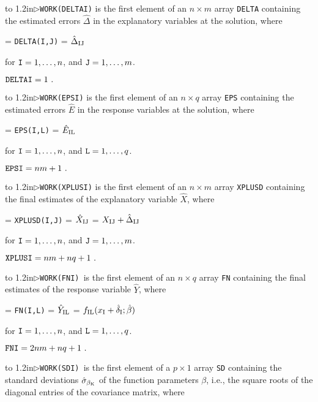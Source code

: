 \hangindent\wd\mybox{}\noindent\hbox to 1.2in{$\triangleright$\hfil{\tt WORK(DELTAI)} }is the first element of an $n\times m$ array {\tt DELTA} containing the estimated errors $\hat{\Delta}$ in the explanatory variables at the solution, where

 = {\tt DELTA(I,J)} = $\hat{\Delta}_{\rm IJ}$

\aligntobox for ${\tt I} = 1,\ldots,n$, and ${\tt J} = 1,\ldots,m$.

\aligntobox ${\tt DELTAI} = 1\ .$
\bigskip

\hangindent\wd\mybox{}\noindent\hbox to 1.2in{$\triangleright$\hfill{\tt WORK(EPSI)} }is the first element of an $n \times q$ array {\tt EPS} containing the estimated errors $\hat E$ in the response variables at the solution, where

 = {\tt EPS(I,L)} = $\hat{E}_{\rm
IL}$

\aligntobox for ${\tt I} = 1,\ldots,n$, and ${\tt L} = 1,\ldots,q$.

\aligntobox ${\tt EPSI} = nm + 1\ .$
\bigskip

\hangindent\wd\mybox{}\noindent\hbox to 1.2in{$\triangleright$\hfill{\tt WORK(XPLUSI)} }is the first element of an $n \times m$ array {\tt XPLUSD} containing the final estimates of the explanatory variable $\hat{X}$, where

 = {\tt XPLUSD(I,J)} =
$\hat{X}_{\rm IJ}$ = $X_{\rm IJ}+\hat{\Delta}_{\rm IJ}$

\aligntobox for ${\tt I} = 1,\ldots,n$, and ${\tt J} = 1,\ldots,m$.

\aligntobox ${\tt XPLUSI} = nm + nq + 1\ .$
\bigskip

\hangindent\wd\mybox{}\noindent\hbox to 1.2in{$\triangleright$\hfill\tt WORK(FNI) }is the first element of an $n\times q$ array {\tt FN} containing the final estimates of the response variable $\hat{Y}$, where

 = {\tt FN(I,L)} = $\hat{Y}_{\rm IL}$ =
$f_{\rm IL}(x_{\rm I}+\hat{\delta}_{\rm I};\hat{\beta})$

\aligntobox for ${\tt I} = 1,\ldots,n$, and ${\tt L} = 1,\ldots,q$.

\aligntobox ${\tt FNI}=2nm+nq+1\ .$
\bigskip

\hangindent\wd\mybox{}\noindent\hbox to 1.2in{$\triangleright$\hfill\tt WORK(SDI) }is the first element of a $p \times 1$ array {\tt SD} containing the standard deviations $\hat{\sigma}_{\beta_{\rm K}}$ of the function parameters $\beta$, i.e., the square roots of the diagonal entries of the covariance matrix, where

